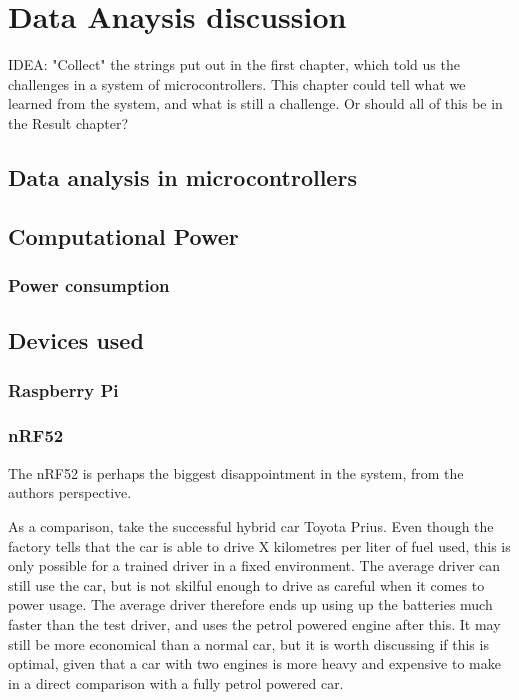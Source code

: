 \chapter{Data Anaysis discussion}
\label{chp:dataAnalysis}

IDEA: "Collect" the strings put out in the first chapter, which told us the challenges in a system of microcontrollers. This chapter could tell what we learned from the system, and what is still a challenge. Or should all of this be in the Result chapter? 

\section{Data analysis in microcontrollers}

\section{Computational Power}

\subsection{Power consumption}


\section{Devices used}


\subsection{Raspberry Pi}



\subsection{nRF52}

The nRF52 is perhaps the biggest disappointment in the system, from the authors perspective. 


As a comparison, take the successful hybrid car Toyota Prius. Even though the factory tells that the car is able to drive X kilometres per liter of fuel used, this is only possible for a trained driver in a fixed environment. The average driver can still use the car, but is not skilful enough to drive as careful when it comes to power usage. The average driver therefore ends up using up the batteries much faster than the test driver, and uses the petrol powered engine after this. It may still be more economical than a normal car, but it is worth discussing if this is optimal, given that a car with two engines is more heavy and expensive to make in a direct comparison with a fully petrol powered car. 

